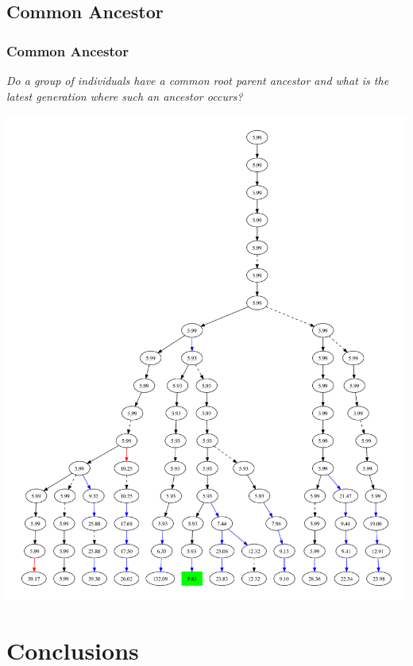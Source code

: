 \documentclass{beamer}
\begin{document}
\subsection[Common Ancestor]{Common Ancestor}

\begin{frame}
\frametitle{Common Ancestor}
\emph{Do a group of individuals have a common root parent ancestor and what is the latest generation where such an ancestor occurs?}
\begin{center}
\includegraphics[height=0.75\textheight]{subset_confluence_trimmed}
\end{center}

\end{frame}

\section[Conclusions]{Conclusions}
\end{document}
